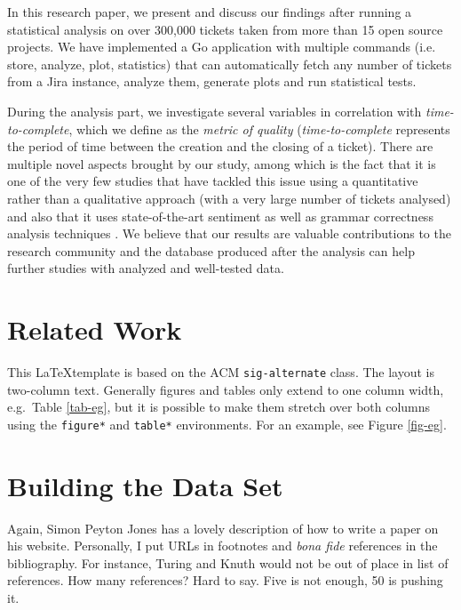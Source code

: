 \documentclass{mpaper}
\begin{document}
In this research paper, we present and discuss our findings after running a statistical analysis 
on over 300,000 tickets taken from more than 15 open source projects. We have implemented a Go application 
with multiple commands (i.e. store, analyze, plot, statistics) that can automatically fetch any number of tickets 
from a Jira instance, analyze them, generate plots and run statistical tests. 

During the analysis part, we investigate several variables in correlation with \emph{time-to-complete}, 
which we define as the \emph{metric of quality} (\emph{time-to-complete} represents the period of time between the creation 
and the closing of a ticket). There are multiple novel aspects brought by our study, among which is the fact that it is one of 
the very few studies that have tackled this issue using a quantitative rather than a qualitative approach (with a very 
large number of tickets analysed) and also that it uses state-of-the-art sentiment \cite{wilson2005recognizing} as well as 
grammar correctness analysis techniques \cite{wilson2005recognizing}. We believe that our results are valuable 
contributions to the research community and the database produced after the analysis can help further studies with 
analyzed and well-tested data.

\section{Related Work}

This \LaTeX template is based on the ACM \texttt{sig-alternate} class.
The layout is two-column text. Generally figures and tables only
extend to one column width, e.g.\ Table \ref{tab-eg},
but it is possible to make them
stretch over both columns using the \texttt{figure*} and
\texttt{table*} environments. For an example, see Figure \ref{fig-eg}.



\section{Building the Data Set}

Again, Simon Peyton Jones has a lovely description of how to write a
paper on his
website.
Personally, I put URLs in footnotes and \emph{bona fide} references
in the bibliography. For instance, Turing \cite{turing37computable}
and Knuth \cite{knuth68art} would not be out of place in list of
references.
How many references? Hard to say. Five is not enough, 50 is pushing
it.
\end{document}
